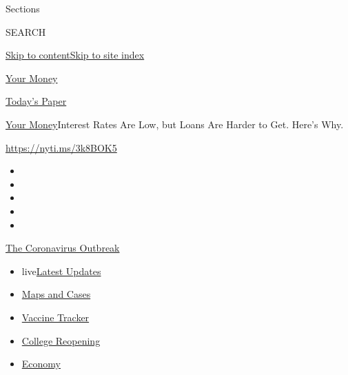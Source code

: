 Sections

SEARCH

\protect\hyperlink{site-content}{Skip to
content}\protect\hyperlink{site-index}{Skip to site index}

\href{https://www.nytimes.com/section/your-money}{Your Money}

\href{https://myaccount.nytimes.com/auth/login?response_type=cookie\&client_id=vi}{}

\href{https://www.nytimes.com/section/todayspaper}{Today's Paper}

\href{/section/your-money}{Your Money}\textbar{}Interest Rates Are Low,
but Loans Are Harder to Get. Here's Why.

\url{https://nyti.ms/3k8BOK5}

\begin{itemize}
\item
\item
\item
\item
\item
\end{itemize}

\href{https://www.nytimes.com/news-event/coronavirus?action=click\&pgtype=Article\&state=default\&region=TOP_BANNER\&context=storylines_menu}{The
Coronavirus Outbreak}

\begin{itemize}
\tightlist
\item
  live\href{https://www.nytimes.com/2020/08/04/world/coronavirus-cases.html?action=click\&pgtype=Article\&state=default\&region=TOP_BANNER\&context=storylines_menu}{Latest
  Updates}
\item
  \href{https://www.nytimes.com/interactive/2020/us/coronavirus-us-cases.html?action=click\&pgtype=Article\&state=default\&region=TOP_BANNER\&context=storylines_menu}{Maps
  and Cases}
\item
  \href{https://www.nytimes.com/interactive/2020/science/coronavirus-vaccine-tracker.html?action=click\&pgtype=Article\&state=default\&region=TOP_BANNER\&context=storylines_menu}{Vaccine
  Tracker}
\item
  \href{https://www.nytimes.com/2020/08/02/us/covid-college-reopening.html?action=click\&pgtype=Article\&state=default\&region=TOP_BANNER\&context=storylines_menu}{College
  Reopening}
\item
  \href{https://www.nytimes.com/live/2020/08/04/business/stock-market-today-coronavirus?action=click\&pgtype=Article\&state=default\&region=TOP_BANNER\&context=storylines_menu}{Economy}
\end{itemize}

